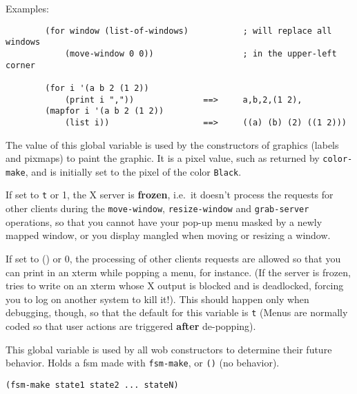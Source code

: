 Examples:{\exemplefont\upspace\begin{verbatim}
        (for window (list-of-windows)           ; will replace all windows
            (move-window 0 0))                  ; in the upper-left corner

        (for i '(a b 2 (1 2)) 
            (print i ","))              ==>     a,b,2,(1 2),
        (mapfor i '(a b 2 (1 2))
            (list i))                   ==>     ((a) (b) (2) ((1 2)))
\end{verbatim}}

        

The value of this global variable is used by the constructors of graphics
(labels and pixmaps) to paint the graphic. It is a pixel value, such as
returned by \verb"color-make", and is initially set to the pixel of the color
\verb"Black".

        

If set to \verb"t" or 1, the X server is {\bf frozen}, i.e.\ it doesn't
process the requests for other clients during the \verb"move-window",
\verb"resize-window" and \verb"grab-server" operations, so that you cannot
have your pop-up menu masked by a newly mapped window, or you display
mangled when moving or resizing a window.

If set to () or 0, the processing of other clients requests are allowed so
that you can print in an xterm while popping a menu, for instance. (If the
server is frozen, {\GWM} tries to write on an xterm whose X output is blocked
and {\GWM} is deadlocked, forcing you to log on another system to kill it!).
This should happen only when debugging, though, so that the default for this
variable is \verb"t" (Menus are normally coded so that user actions are
triggered {\bf after} de-popping).

        

This global variable is used by all wob constructors to determine their future
behavior. Holds a fsm made with \verb"fsm-make", or \verb"()" (no behavior).

        
{\usagefont\begin{verbatim}
(fsm-make state1 state2 ... stateN)
\end{verbatim}}\usageupspace

